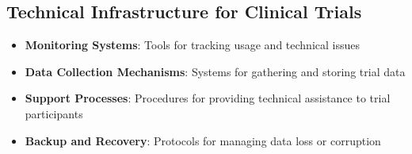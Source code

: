 \subsection{Technical Infrastructure for Clinical Trials}
\begin{itemize}
    \item \textbf{Monitoring Systems}: Tools for tracking usage and technical issues
    \item \textbf{Data Collection Mechanisms}: Systems for gathering and storing trial data
    \item \textbf{Support Processes}: Procedures for providing technical assistance to trial participants
    \item \textbf{Backup and Recovery}: Protocols for managing data loss or corruption
\end{itemize}